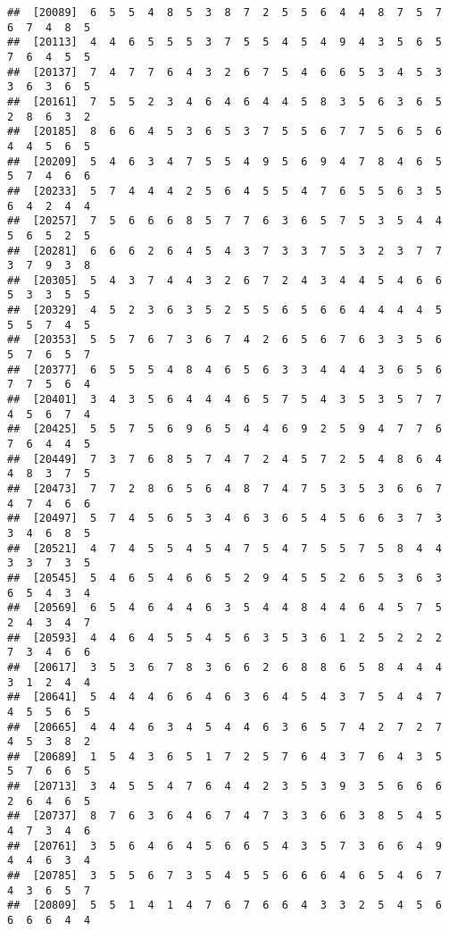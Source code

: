 \documentclass[
]{book}
\begin{document}
\begin{verbatim}
##  [20089]  6  5  5  4  8  5  3  8  7  2  5  5  6  4  4  8  7  5  7  6  7  4  8  5
##  [20113]  4  4  6  5  5  5  3  7  5  5  4  5  4  9  4  3  5  6  5  7  6  4  5  5
##  [20137]  7  4  7  7  6  4  3  2  6  7  5  4  6  6  5  3  4  5  3  3  6  3  6  5
##  [20161]  7  5  5  2  3  4  6  4  6  4  4  5  8  3  5  6  3  6  5  2  8  6  3  2
##  [20185]  8  6  6  4  5  3  6  5  3  7  5  5  6  7  7  5  6  5  6  4  4  5  6  5
##  [20209]  5  4  6  3  4  7  5  5  4  9  5  6  9  4  7  8  4  6  5  5  7  4  6  6
##  [20233]  5  7  4  4  4  2  5  6  4  5  5  4  7  6  5  5  6  3  5  6  4  2  4  4
##  [20257]  7  5  6  6  6  8  5  7  7  6  3  6  5  7  5  3  5  4  4  5  6  5  2  5
##  [20281]  6  6  6  2  6  4  5  4  3  7  3  3  7  5  3  2  3  7  7  3  7  9  3  8
##  [20305]  5  4  3  7  4  4  3  2  6  7  2  4  3  4  4  5  4  6  6  5  3  3  5  5
##  [20329]  4  5  2  3  6  3  5  2  5  5  6  5  6  6  4  4  4  4  5  5  5  7  4  5
##  [20353]  5  5  7  6  7  3  6  7  4  2  6  5  6  7  6  3  3  5  6  5  7  6  5  7
##  [20377]  6  5  5  5  4  8  4  6  5  6  3  3  4  4  4  3  6  5  6  7  7  5  6  4
##  [20401]  3  4  3  5  6  4  4  4  6  5  7  5  4  3  5  3  5  7  7  4  5  6  7  4
##  [20425]  5  5  7  5  6  9  6  5  4  4  6  9  2  5  9  4  7  7  6  7  6  4  4  5
##  [20449]  7  3  7  6  8  5  7  4  7  2  4  5  7  2  5  4  8  6  4  4  8  3  7  5
##  [20473]  7  7  2  8  6  5  6  4  8  7  4  7  5  3  5  3  6  6  7  4  7  4  6  6
##  [20497]  5  7  4  5  6  5  3  4  6  3  6  5  4  5  6  6  3  7  3  3  4  6  8  5
##  [20521]  4  7  4  5  5  4  5  4  7  5  4  7  5  5  7  5  8  4  4  3  3  7  3  5
##  [20545]  5  4  6  5  4  6  6  5  2  9  4  5  5  2  6  5  3  6  3  6  5  4  3  4
##  [20569]  6  5  4  6  4  4  6  3  5  4  4  8  4  4  6  4  5  7  5  2  4  3  4  7
##  [20593]  4  4  6  4  5  5  4  5  6  3  5  3  6  1  2  5  2  2  2  7  3  4  6  6
##  [20617]  3  5  3  6  7  8  3  6  6  2  6  8  8  6  5  8  4  4  4  3  1  2  4  4
##  [20641]  5  4  4  4  6  6  4  6  3  6  4  5  4  3  7  5  4  4  7  4  5  5  6  5
##  [20665]  4  4  4  6  3  4  5  4  4  6  3  6  5  7  4  2  7  2  7  4  5  3  8  2
##  [20689]  1  5  4  3  6  5  1  7  2  5  7  6  4  3  7  6  4  3  5  5  7  6  6  5
##  [20713]  3  4  5  5  4  7  6  4  4  2  3  5  3  9  3  5  6  6  6  2  6  4  6  5
##  [20737]  8  7  6  3  6  4  6  7  4  7  3  3  6  6  3  8  5  4  5  4  7  3  4  6
##  [20761]  3  5  6  4  6  4  5  6  6  5  4  3  5  7  3  6  6  4  9  4  4  6  3  4
##  [20785]  3  5  5  6  7  3  5  4  5  5  6  6  6  4  6  5  4  6  7  4  3  6  5  7
##  [20809]  5  5  1  4  1  4  7  6  7  6  6  4  3  3  2  5  4  5  6  6  6  6  4  4

\end{verbatim}
\end{document}

